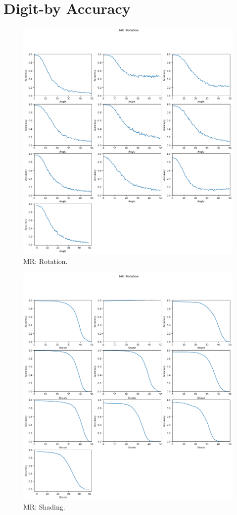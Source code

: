 \section{Digit-by Accuracy}
\begin{figure}
  \includegraphics[width=\linewidth]{images/rotation1}
  \caption{MR: Rotation.}
  \label{fig:rotation 1}
\end{figure}

\begin{figure}
  \includegraphics[width=\linewidth]{images/shade1}
  \caption{MR: Shading.}
  \label{fig: Shading}
\end{figure}

